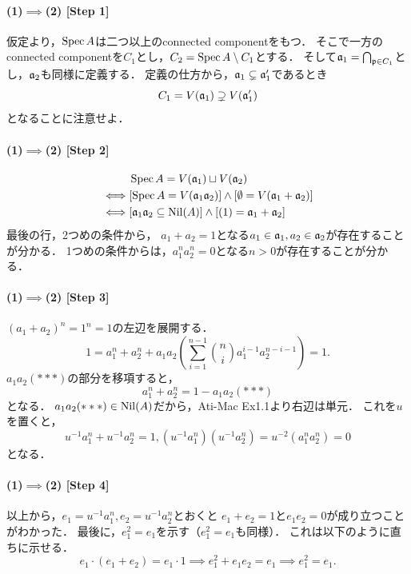 \documentclass[a4paper]{jsarticle}
\begin{document}
    \paragraph{(1)$\implies$(2) [Step 1]}
    仮定より，$\operatorname{Spec} A$は二つ以上のconnected componentをもつ．
    そこで一方のconnected componentを$C_1$とし，$C_2=\operatorname{Spec} A \setminus C_1$とする．
    そして$\mathfrak{a}_1=\bigcap_{\mathfrak{p} \in C_1}$とし，$\mathfrak{a}_2$も同様に定義する．
    定義の仕方から，$\mathfrak{a}_1 \subsetneq \mathfrak{a}_1'$であるとき
    \[ C_1=V(\mathfrak{a}_1) \supsetneq V(\mathfrak{a}_1') \]
    となることに注意せよ．

    \paragraph{(1)$\implies$(2) [Step 2]}
    \begin{align*}
        {}& \operatorname{Spec} A=V(\mathfrak{a}_1) \sqcup V(\mathfrak{a}_2) \\
        \iff& [\operatorname{Spec} A=V(\mathfrak{a}_1 \mathfrak{a}_2)] \land [\emptyset=V(\mathfrak{a}_1+\mathfrak{a}_2)] \\
        \iff& [\mathfrak{a}_1 \mathfrak{a}_2 \subseteq \operatorname{Nil}(A)] \land [(1)=\mathfrak{a}_1+\mathfrak{a}_2] \label{ex219-1}
    \end{align*}
    最後の行，2つめの条件から，
    $a_1+a_2=1$となる$a_1 \in \mathfrak{a}_1, a_2 \in \mathfrak{a}_2$が存在することが分かる．
    1つめの条件からは，$a_1^n a_2^n=0$となる$n>0$が存在することが分かる．

    \paragraph{(1)$\implies$(2) [Step 3]}
    $(a_1+a_2)^n=1^n=1$の左辺を展開する．
    \[ 1=a_1^n+a_2^n+a_1a_2 \left( \sum_{i=1}^{n-1} \binom{n}{i}a_1^{i-1}a_2^{n-i-1} \right)=1. \]
    $a_1a_2(***)$の部分を移項すると，
    \[ a_1^n+a_2^n=1-a_1a_2(***) \]
    となる．
    $a_1a_2(***) \in \operatorname{Nil}(A)$だから，Ati-Mac Ex1.1より右辺は単元．
    これを$u$を置くと，
    \[ u^{-1}a_1^n+u^{-1}a_2^n=1, (u^{-1}a_1^n)(u^{-1}a_2^n)=u^{-2}(a_1^na_2^n)=0 \]
    となる．

    \paragraph{(1)$\implies$(2) [Step 4]}
    以上から，$e_1=u^{-1}a_1^n, e_2=u^{-1}a_2^n$とおくと
    $e_1+e_2=1$と$e_1e_2=0$が成り立つことがわかった．
    最後に，$e_1^2=e_1$を示す（$e_1^2=e_1$も同様）．
    これは以下のように直ちに示せる．
    \[ e_1 \cdot (e_1+e_2)=e_1 \cdot 1 \implies e_1^2+e_1e_2=e_1 \implies e_1^2=e_1. \]
\end{document}
